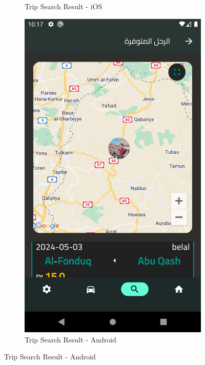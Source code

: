 \documentclass[a4paper, 12pt]{report} %
\begin{document}
\begin{figure}[H]
\begin{subfigure}{0.31\textwidth}
                    \caption{Trip Search Result - iOS}
                    \label{fig:trip_search_3}
                \end{subfigure}
                \begin{subfigure}{0.31\textwidth}
                    \includegraphics[width=\linewidth]{Images/trip_search_4.png}
                    \caption{Trip Search Result - Android}
                    \label{fig:trip_search_4}
                \end{subfigure}

\end{figure}
\end{document}
